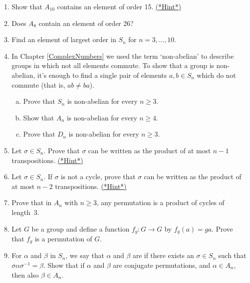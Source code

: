  
\begin{enumerate}
 
  
\item \label{ex:Permutations:Ad1}
Show that $A_{10}$ contains an element of order 15.
\hyperref[sec:Permutations:Hints]{(*Hint*)}
 
 
\item
Does $A_8$ contain an element of order 26?
 
 
\item %
Find an element of largest order in $S_n$ for $n = 3, \ldots, 10$. 
 
  
 \item
In Chapter \ref{ComplexNumbers} we used the term `non-abelian' to describe groups in which not all elements commute. To show that a group is non-abelian, it's enough to find a single pair of elements $a, b \in S_n$ which do not commute (that is, $ab \neq ba$).
\begin{enumerate}[(a)]
\item
Prove that $S_n$ is non-abelian for every $n \geq 3$. 
\item
Show that $A_n$ is non-abelian for every $n \geq 4$.
\item
Prove that $D_n$ is non-abelian for every $n \geq 3$.
 \end{enumerate} 



\item \label{ex:Permutations:Ad2}
Let $\sigma \in S_n$. Prove that $\sigma$ can be written as the
product of at most $n-1$ transpositions.
\hyperref[sec:Permutations:Hints]{(*Hint*)}

\item \label{ex:Permutations:Ad3}
Let $\sigma \in S_n$. If $\sigma$ is not a cycle, prove that $\sigma$
can be written as the product of at most $n-2$ transpositions.
\hyperref[sec:Permutations:Hints]{(*Hint*)}
  
\item
Prove that in $A_n$ with $n \geq 3$, any permutation is a product of
cycles of length~3.  
 
 
\item
Let $G$ be a group and define a function $f_g : G \rightarrow G$ by
$f_g(a) = g a$.  Prove that $f_g$ is a permutation of $G$.
 
 
\item
For $\alpha$ and $\beta$ in $S_n$, we say that $\alpha$ and $ \beta$ are
if there
exists an $\sigma \in S_n$ such that $\sigma \alpha \sigma^{-1} =
\beta$.  
Show that if $\alpha$ and  $\beta$ are conjugate permutations, and $\alpha \in A_n$, then also  $\beta \in A_n$.


\end{enumerate}
